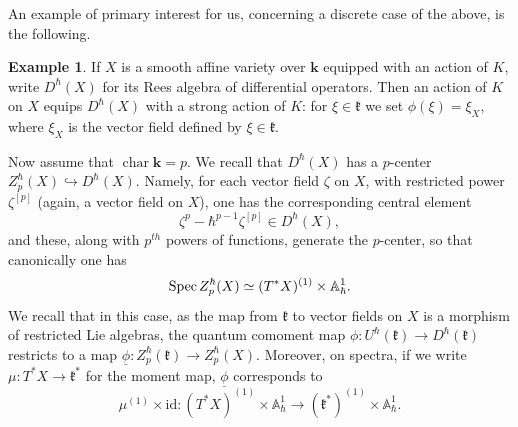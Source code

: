 \documentclass{amsart}
\theoremstyle{definition}
\newtheorem{Ex}[Thm]{Example}
\newcommand{\fk}{\mathfrak{k}}
\newcommand{\sss}{\subsubsection{}}
\newcommand{\Spec}{\on{Spec}\hspace{.5mm}}
\newcommand{\on}{\mathrm}
\newcommand{\bk}{\mathbf{k}}
\numberwithin{equation}{section}
\begin{document}
\sss An example of primary interest for us, concerning a discrete case of the above, is the following.
\begin{Ex}  \label{ex:variety} If $X$ is a smooth affine variety over $\bk$ equipped with an action of $K$,  write $D^\hbar(X)$ for its Rees algebra of differential operators. Then an action of $K$ on $X$ equips     $D^\hbar(X)$ with a strong action of $K$: for $\xi\in \fk$ we set $\phi(\xi)=\xi_X$, where $\xi_X$ is the  vector field defined by $\xi\in \fk$.

Now assume that $\operatorname{char}\bk=p$.
We recall that $D^\hbar(X)$ has a $p$-center $Z^\hbar_p(X) \hookrightarrow D^\hbar(X)$. Namely, for each vector field $\zeta$ on $X$, with restricted power $\zeta^{[p]}$ (again, a vector field on $X$), one has the corresponding central element$$\zeta^p - \hbar^{p-1} \zeta^{[p]} \in D^\hbar(X),$$and these, along with $p^{th}$ powers of functions, generate the $p$-center, so that canonically one has
$$\Spec Z^\hbar_p(X) \simeq (T^* X)^{(1)} \times \mathbb{A}^1_\hbar.$$
We recall that in this case, as the map from $\fk$ to vector fields on $X$ is a morphism of restricted Lie algebras, the quantum comoment map $\phi: U^\hbar(\fk) \rightarrow D^\hbar(\fk)$ restricts to a map $\underline{\phi}: Z^\hbar_p(\fk) \rightarrow Z^\hbar_p(X)$. Moreover, on spectra, if we write $\mu: T^* X \rightarrow \fk^*$ for the moment map, $\underline{\phi}$ corresponds to 
$$\mu^{(1)} \times \on{id}: (T^*X)^{(1)} \times \mathbb{A}^1_\hbar \rightarrow (\fk^*)^{(1)} \times \mathbb{A}^1_\hbar.$$\end{Ex}
\end{document}
